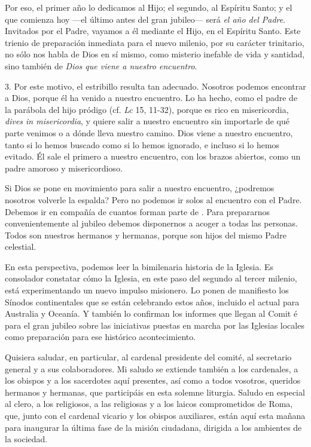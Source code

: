 Por eso, el primer año lo dedicamos al Hijo; el segundo, al Espíritu Santo; y el que comienza hoy ---el último antes del gran jubileo--- será \emph{el año del Padre}. Invitados por el Padre, vayamos a él mediante el Hijo, en el Espíritu Santo. Este trienio de preparación inmediata para el nuevo milenio, por su carácter trinitario, no sólo nos habla de Dios en sí mismo, como misterio inefable de vida y santidad, sino también de \emph{Dios que viene a nuestro encuentro}.

3. Por este motivo, el estribillo  resulta tan adecuado. Nosotros podemos encontrar a Dios, porque él ha venido a nuestro encuentro. Lo ha hecho, como el padre de la parábola del hijo pródigo (cf. \emph{Lc} 15, 11-32), porque es rico en misericordia, \emph{dives in misericordia}, y quiere salir a nuestro encuentro sin importarle de qué parte venimos o a dónde lleva nuestro camino. Dios viene a nuestro encuentro, tanto si lo hemos buscado como si lo hemos ignorado, e incluso si lo hemos evitado. Él sale el primero a nuestro encuentro, con los brazos abiertos, como un padre amoroso y misericordioso.

Si Dios se pone en movimiento para salir a nuestro encuentro, ¿podremos nosotros volverle la espalda? Pero no podemos ir solos al encuentro con el Padre. Debemos ir en compañía de cuantos forman parte de . Para prepararnos convenientemente al jubileo debemos disponernos a acoger a todas las personas. Todos son nuestros hermanos y hermanas, porque son hijos del mismo Padre celestial.

En esta perspectiva, podemos leer la bimilenaria historia de la Iglesia. Es consolador constatar cómo la Iglesia, en este paso del segundo al tercer milenio, está experimentando un nuevo impulso misionero. Lo ponen de manifiesto los Sínodos continentales que se están celebrando estos años, incluido el actual para Australia y Oceanía. Y también lo confirman los informes que llegan al Comit é para el gran jubileo sobre las iniciativas puestas en marcha por las Iglesias locales como preparación para ese histórico acontecimiento.

Quisiera saludar, en particular, al cardenal presidente del comité, al secretario general y a sus colaboradores. Mi saludo se extiende también a los cardenales, a los obispos y a los sacerdotes aquí presentes, así como a todos vosotros, queridos hermanos y hermanas, que participáis en esta solemne liturgia. Saludo en especial al clero, a los religiosos, a las religiosas y a los laicos comprometidos de Roma, que, junto con el cardenal vicario y los obispos auxiliares, están aquí esta mañana para inaugurar la última fase de la misión ciudadana, dirigida a los ambientes de la sociedad.

